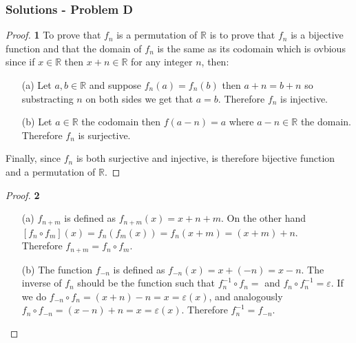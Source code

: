\documentclass[11pt]{article}
\begin{document}
	\subsubsection*{Solutions - Problem D}
	\begin{proof}{\textbf{1}}
		To prove that $f_n$ is a permutation of $\mathbb{R}$ is to prove that $f_n$ is a bijective function and that the domain of $f_n$ is the same as its codomain which is ovbious since if $x \in \mathbb{R}$ then $x+n \in \mathbb{R}$ for any integer $n$, then:
		\begin{itemize}
			\item[(a)] Let $a,b \in \mathbb{R}$ and suppose $f_n(a)=f_n(b)$ then $a+n=b+n$ so substracting $n$ on both sides we get that $a=b$. Therefore $f_n$ is injective.
			\item[(b)] Let $a \in \mathbb{R}$ the codomain then $f(a-n)=a$ where $a-n \in \mathbb{R}$ the domain. Therefore $f_n$ is surjective.
		\end{itemize}
		Finally, since $f_n$ is both surjective and injective, is therefore bijective function and a permutation of $\mathbb{R}$.
	\end{proof}
	\begin{proof}{\textbf{2}}
		\begin{itemize}
			\item[(a)] $f_{n+m}$ is defined as $f_{n+m}(x) = x + n + m$. On the other hand\\ $[f_n \circ f_m](x) = f_n(f_m(x))=f_n(x+m)=(x+m)+n$.\\ Therefore $f_{n+m}=f_n \circ f_m$. 
			\item[(b)] The function $f_{-n}$ is defined as $f_{-n}(x) = x + (-n)=x - n$. The inverse of $f_n$ should be the function such that $f^{-1}_n \circ f_n =$ \ep and $f_n \circ f^{-1}_n = \varepsilon$. If we do $f_{-n} \circ f_n = (x + n) - n = x = \varepsilon(x)$, and analogously $f_{n} \circ f_{-n} = (x - n) + n = x = \varepsilon(x)$. Therefore $f^{-1}_n = f_{-n}$.
		\end{itemize}
	\end{proof}
\end{document}
